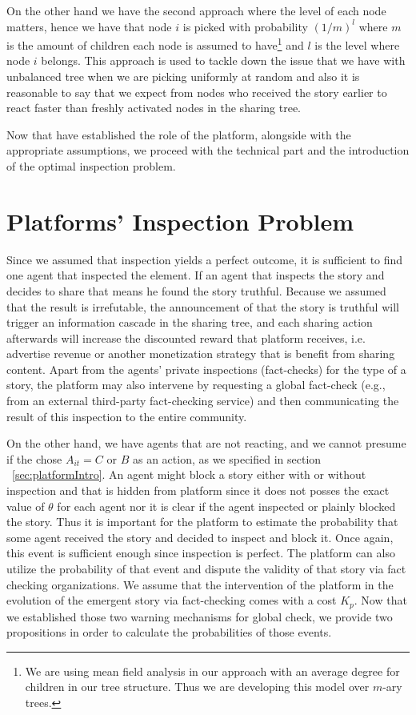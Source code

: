 On the other hand we have the second approach where the level of each node matters, hence we have that node $i$ is picked with probability $(1/m)^l$ where $m$ is the amount of children each node is assumed to have\footnote{We are using mean field analysis in our approach with an average degree for children in our tree structure. Thus we are developing this model over $m$-ary trees.} and $l$ is the level where node $i$ belongs. This approach is used to tackle down the issue that we have with unbalanced tree when we are picking uniformly at random and also it is reasonable to say that we expect from nodes who received the story earlier to react faster than freshly activated nodes in the sharing tree.

Now that have established the role of the platform, alongside with the appropriate assumptions, we proceed with the technical part and the introduction of the optimal inspection problem. 


\section{Platforms' Inspection Problem}
\label{sec:platformInspection}

Since we assumed that inspection yields a perfect outcome, it is sufficient to find one agent that inspected the element. If an agent that inspects the story and decides to share that means he found the story truthful. Because we assumed that the result is irrefutable, the announcement of that the story is truthful will trigger an information cascade in the sharing tree, and each sharing action afterwards will increase the discounted reward that platform receives, i.e. advertise revenue or another monetization strategy that is benefit from sharing content. Apart from the agents' private inspections (fact-checks) for the type of a story, the platform may also intervene by requesting a global fact-check (e.g., from an external third-party fact-checking service) and then communicating the result of this inspection to the entire community.  

On the other hand, we have agents that are not reacting, and we cannot presume if the chose $A_{it} = C$ or $B$ as an action, as we specified in section ~\ref{sec:platformIntro}. An agent might block a story either with or without inspection and that is hidden from platform since it does not posses the exact value of $\theta$ for each agent nor it is clear if the agent inspected or plainly blocked the story. Thus it is important for the platform to estimate the probability that some agent received the story and decided to inspect and block it. Once again, this event is sufficient enough since inspection is perfect. The platform can also utilize the probability of that event and dispute the validity of that story via fact checking organizations. We assume that the intervention of the platform in the evolution of the emergent story via fact-checking comes with a cost $K_p$. Now that we established those two warning mechanisms for global check, we provide two propositions in order to calculate the probabilities of those events.

